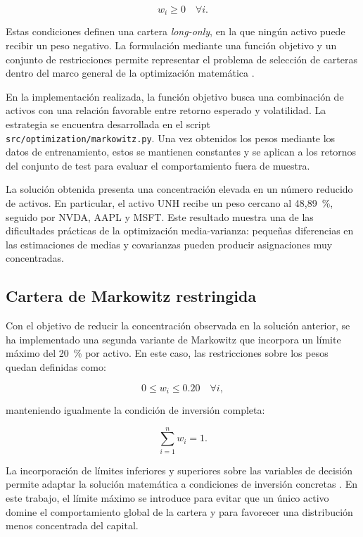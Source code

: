 \begin{equation}
w_i \geq 0 \quad \forall i.
\end{equation}

Estas condiciones definen una cartera \textit{long-only}, en la que ningún activo puede recibir un peso negativo. La formulación mediante una función objetivo y un conjunto de restricciones permite representar el problema de selección de carteras dentro del marco general de la optimización matemática \cite{boyd2004convex}.

En la implementación realizada, la función objetivo busca una combinación de activos con una relación favorable entre retorno esperado y volatilidad. La estrategia se encuentra desarrollada en el script \texttt{src/optimization/markowitz.py}. Una vez obtenidos los pesos mediante los datos de entrenamiento, estos se mantienen constantes y se aplican a los retornos del conjunto de test para evaluar el comportamiento fuera de muestra.

La solución obtenida presenta una concentración elevada en un número reducido de activos. En particular, el activo UNH recibe un peso cercano al 48,89~\%, seguido por NVDA, AAPL y MSFT. Este resultado muestra una de las dificultades prácticas de la optimización media-varianza: pequeñas diferencias en las estimaciones de medias y covarianzas pueden producir asignaciones muy concentradas.

\subsection{Cartera de Markowitz restringida}

Con el objetivo de reducir la concentración observada en la solución anterior, se ha implementado una segunda variante de Markowitz que incorpora un límite máximo del 20~\% por activo. En este caso, las restricciones sobre los pesos quedan definidas como:

\begin{equation}
0 \leq w_i \leq 0.20 \quad \forall i,
\end{equation}

manteniendo igualmente la condición de inversión completa:

\begin{equation}
\sum_{i=1}^{n} w_i = 1.
\end{equation}

La incorporación de límites inferiores y superiores sobre las variables de decisión permite adaptar la solución matemática a condiciones de inversión concretas \cite{boyd2004convex}. En este trabajo, el límite máximo se introduce para evitar que un único activo domine el comportamiento global de la cartera y para favorecer una distribución menos concentrada del capital.

